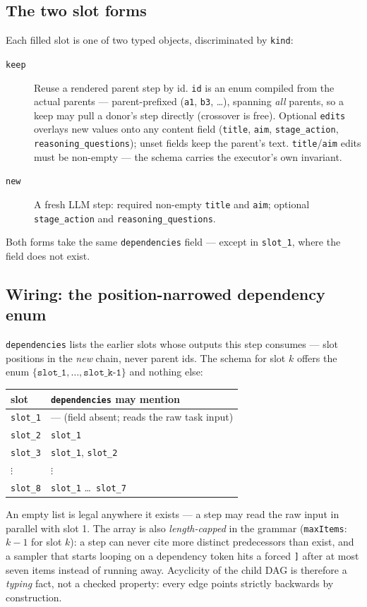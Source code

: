 \documentclass[11pt]{article}
\begin{document}
\subsection{The two slot forms}
Each filled slot is one of two typed objects, discriminated by \texttt{kind}:
\begin{description}
  \item[\texttt{keep}] Reuse a rendered parent step by id. \texttt{id} is an enum compiled
  from the actual parents --- parent-prefixed (\texttt{a1}, \texttt{b3}, \dots), spanning
  \emph{all} parents, so a keep may pull a donor's step directly (crossover is free).
  Optional \texttt{edits} overlays new values onto any content field
  (\texttt{title}, \texttt{aim}, \texttt{stage\_action}, \texttt{reasoning\_questions});
  unset fields keep the parent's text. \texttt{title}/\texttt{aim} edits must be non-empty
  --- the schema carries the executor's own invariant.
  \item[\texttt{new}] A fresh LLM step: required non-empty \texttt{title} and \texttt{aim};
  optional \texttt{stage\_action} and \texttt{reasoning\_questions}.
\end{description}
Both forms take the same \texttt{dependencies} field --- except in \texttt{slot\_1}, where
the field does not exist.

\subsection{Wiring: the position-narrowed dependency enum}
\texttt{dependencies} lists the earlier slots whose outputs this step consumes --- slot
positions in the \emph{new} chain, never parent ids. The schema for slot $k$ offers the enum
$\{\texttt{slot\_1},\dots,\texttt{slot\_{k-1}}\}$ and nothing else:
\begin{center}
\footnotesize
\begin{tabular}{ll}
\toprule
slot & \texttt{dependencies} may mention \\
\midrule
\texttt{slot\_1} & --- (field absent; reads the raw task input) \\
\texttt{slot\_2} & \texttt{slot\_1} \\
\texttt{slot\_3} & \texttt{slot\_1}, \texttt{slot\_2} \\
$\vdots$ & $\vdots$ \\
\texttt{slot\_8} & \texttt{slot\_1} \dots\ \texttt{slot\_7} \\
\bottomrule
\end{tabular}
\end{center}
An empty list is legal anywhere it exists --- a step may read the raw input in parallel with
slot 1. The array is also \emph{length-capped} in the grammar (\texttt{maxItems}: $k-1$ for
slot $k$): a step can never cite more distinct predecessors than exist, and a sampler that
starts looping on a dependency token hits a forced \texttt{]} after at most seven items
instead of running away. Acyclicity of the child DAG is therefore a \emph{typing} fact, not
a checked property: every edge points strictly backwards by construction.
\end{document}
